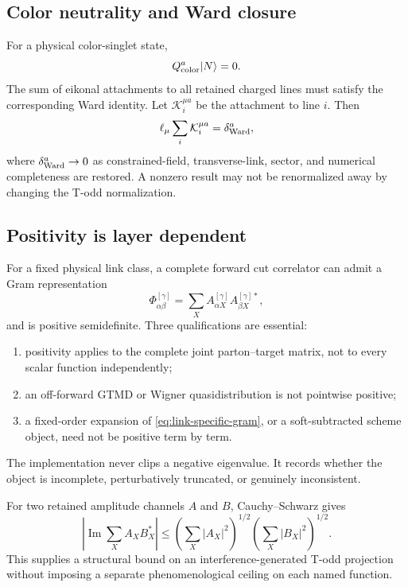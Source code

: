 \documentclass[11pt]{article}
\newcommand{\cK}{\mathcal K}
\begin{document}
\subsection{Color neutrality and Ward closure}

For a physical color-singlet state,
\begin{equation}
 Q^a_{\rm color}|N\rangle=0.
\label{eq:color-neutrality-repeated}
\end{equation}
The sum of eikonal attachments to all retained charged lines must satisfy the
corresponding Ward identity.  Let \(\cK_i^{\mu a}\) be the attachment to line
\(i\).  Then
\begin{equation}
 \ell_\mu\sum_i \cK_i^{\mu a}
 =\delta_{\rm Ward}^a,
\label{eq:ward-residual-sum}
\end{equation}
where \(\delta_{\rm Ward}^a\to0\) as constrained-field, transverse-link,
sector, and numerical completeness are restored.  A nonzero result may not be
renormalized away by changing the T-odd normalization.

\subsection{Positivity is layer dependent}

For a fixed physical link class, a complete forward cut correlator can admit
a Gram representation
\begin{equation}
 \Phi_{\alpha\beta}^{[\gamma]}
 =\sum_X A_{\alpha X}^{[\gamma]}
       A_{\beta X}^{[\gamma]*},
\label{eq:link-specific-gram}
\end{equation}
and is positive semidefinite.  Three qualifications are essential:
\begin{enumerate}
\item positivity applies to the complete joint parton--target matrix, not to
      every scalar function independently;
\item an off-forward GTMD or Wigner quasidistribution is not pointwise
      positive;
\item a fixed-order expansion of \cref{eq:link-specific-gram}, or a
      soft-subtracted scheme object, need not be positive term by term.
\end{enumerate}
The implementation never clips a negative eigenvalue.  It records whether the
object is incomplete, perturbatively truncated, or genuinely inconsistent.

For two retained amplitude channels \(A\) and \(B\), Cauchy--Schwarz gives
\begin{equation}
 \left|\operatorname{Im}\sum_X A_XB_X^*\right|
 \le
 \left(\sum_X|A_X|^2\right)^{1/2}
 \left(\sum_X|B_X|^2\right)^{1/2}.
\label{eq:phase-cauchy-schwarz}
\end{equation}
This supplies a structural bound on an interference-generated T-odd
projection without imposing a separate phenomenological ceiling on each
named function.
\end{document}
